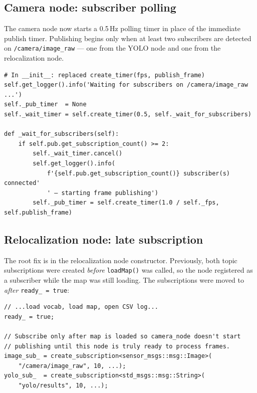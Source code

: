 \documentclass[11pt,a4paper]{article}
\begin{document}
\subsection{Camera node: subscriber polling}

The camera node now starts a 0.5\,Hz polling timer in place of the immediate
publish timer. Publishing begins only when at least two subscribers are
detected on \texttt{/camera/image\_raw} --- one from the YOLO node and one
from the relocalization node.

\begin{lstlisting}[style=python, caption={\texttt{camera\_node.py} --- subscriber wait logic}]
# In __init__: replaced create_timer(fps, publish_frame)
self.get_logger().info('Waiting for subscribers on /camera/image_raw ...')
self._pub_timer  = None
self._wait_timer = self.create_timer(0.5, self._wait_for_subscribers)

def _wait_for_subscribers(self):
    if self.pub.get_subscription_count() >= 2:
        self._wait_timer.cancel()
        self.get_logger().info(
            f'{self.pub.get_subscription_count()} subscriber(s) connected'
            ' — starting frame publishing')
        self._pub_timer = self.create_timer(1.0 / self._fps, self.publish_frame)
\end{lstlisting}

\subsection{Relocalization node: late subscription}

The root fix is in the relocalization node constructor. Previously, both topic
subscriptions were created \emph{before} \texttt{loadMap()} was called, so the
node registered as a subscriber while the map was still loading. The
subscriptions were moved to \emph{after} \texttt{ready\_ = true}:

\begin{lstlisting}[style=cpp, caption={Subscription creation moved to after map load (\texttt{relocalization\_node.cpp})}]
// ...load vocab, load map, open CSV log...
ready_ = true;

// Subscribe only after map is loaded so camera_node doesn't start
// publishing until this node is truly ready to process frames.
image_sub_ = create_subscription<sensor_msgs::msg::Image>(
    "/camera/image_raw", 10, ...);
yolo_sub_  = create_subscription<std_msgs::msg::String>(
    "yolo/results", 10, ...);
\end{lstlisting}
\end{document}
